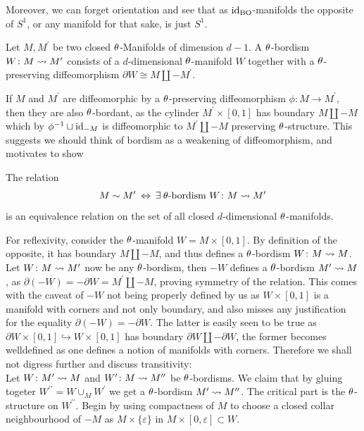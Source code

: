 Moreover, we can forget orientation and see that as $\operatorname{id}_{\mathrm{BO}}$-manifolds the opposite of $S^1$, or any manifold for that sake, is just $S^1$.
\begin{defi}[$\t$-bordism]
    Let $M,M^\prime$ be two closed $\t$-Manifolds of dimension $d-1$. A $\t$-bordism $W\colon M\rightsquigarrow M^\prime$ consists of a $d$-dimensional $\t$-manifold $W$ together with a $\t$-preserving diffeomorphism $\partial W \cong M\amalg -M^\prime$.
\end{defi}
If $M$ and $M^\prime$ are diffeomorphic by a $\t$-preserving diffeomorphism $\phi\colon M\to M^\prime$, then they are also $\t$-bordant, as the cylinder $M^\prime \times [0,1]$ has boundary $M\amalg -M$ which by $\phi^{-1}\sqcup \operatorname{id}_{-M}$ is diffeomorphic to $M^\prime\amalg -M$ preserving $\t$-structure.
This suggests we should think of bordism as a weakening of diffeomorphism, and motivates to show
\begin{thesisprop}
    The relation 
    \begin{equation*}
        M \sim M^\prime \:\Leftrightarrow\:\exists\:\theta\text{-bordism }W\colon M\rightsquigarrow M^\prime
    \end{equation*}
    is an equivalence relation on the set of all closed $d$-dimensional $\t$-manifolds.
\end{thesisprop}
\prf
For reflexivity, consider the $\t$-manifold $W = M\times [0,1]$. 
By definition of the opposite, it has boundary $M\amalg -M$, and thus defines a $\t$-bordism $W\colon M\rightsquigarrow M$.
Let $W\colon M\rightsquigarrow M^\prime$ now be any $\t$-bordism, then $-W$ defines a $\t$-bordism $M^\prime \rightsquigarrow M$, as $\partial (- W) = -\partial W = M^\prime \amalg -M$, proving symmetry of the relation.
This comes with the caveat of $-W$ not being properly defined by us as $W\times[0,1]$ is a manifold with corners and not only boundary, and also misses any justification for the equality $\partial (-W) = -\partial W$.
The latter is easily seen to be true as $\partial W \times [0,1]\hookrightarrow W\times[0,1]$ has boundary $\partial W \amalg -\partial W$, the former becomes welldefined as one defines a notion of manifolds with corners.
Therefore we shall not digress further and discuss transitivity:\\
Let $W\colon M^\prime \rightsquigarrow M$ and $W^\prime \colon M \rightsquigarrow M^{\prime\prime}$ be $\t$-bordisms. 
We claim that by gluing togeter $W^{\prime\prime} = W\cup_{M} W^\prime$ we get a $\t$-bordism $M^\prime\rightsquigarrow M^{\prime\prime}$.
The critical part is the $\t$-structure on $W^{\prime\prime}$.
Begin by using compactness of $M$ to choose a closed collar neighbourhood of $-M$ as $M\times\{\varepsilon\}$ in $M\times[0,\varepsilon]\subset W$.
